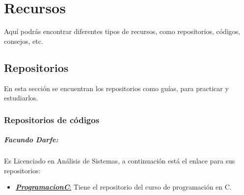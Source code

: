 \chapter[Recursos]{Recursos}
\raggedright
Aquí podrás encontrar diferentes tipos de recursos, como repositorios, códigos, consejos, etc.
\section [Repositorios]{Repositorios}
En esta sección se encuentran los repositorios como guías, para practicar y estudiarlos.
\subsection[Códigos]{Repositorios de códigos}
\paragraph[Facundo Darfe]{Facundo Darfe:}
Es Licenciado en Análisis de Sistemas, a continuación está el enlace para sus repositorios:
\begin{itemize}
	\item \href {https://github.com/facudarfe/ProgramacionC}{\textbf{\textit{ProgramacionC}}:} \label{url:Facudarfe/ProgramacionC} Tiene el repositorio del curso de programación en C.
\end{itemize}